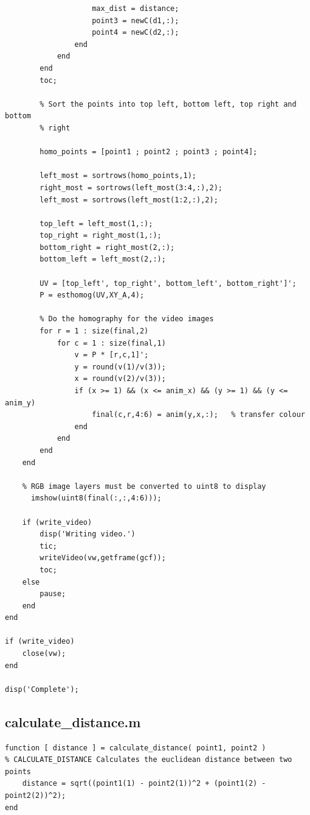 \documentclass[11pt]{article}
\begin{document}
\begin{verbatim}
                    max_dist = distance;
                    point3 = newC(d1,:);
                    point4 = newC(d2,:);
                end
            end
        end
        toc;
        
        % Sort the points into top left, bottom left, top right and bottom
        % right
        
        homo_points = [point1 ; point2 ; point3 ; point4];

        left_most = sortrows(homo_points,1);
        right_most = sortrows(left_most(3:4,:),2);
        left_most = sortrows(left_most(1:2,:),2);

        top_left = left_most(1,:);
        top_right = right_most(1,:);
        bottom_right = right_most(2,:);
        bottom_left = left_most(2,:);

        UV = [top_left', top_right', bottom_left', bottom_right']'; 
        P = esthomog(UV,XY_A,4);

        % Do the homography for the video images
        for r = 1 : size(final,2)
            for c = 1 : size(final,1)
                v = P * [r,c,1]';        
                y = round(v(1)/v(3));
                x = round(v(2)/v(3));
                if (x >= 1) && (x <= anim_x) && (y >= 1) && (y <= anim_y)
                    final(c,r,4:6) = anim(y,x,:);   % transfer colour
                end
            end
        end
    end
  
    % RGB image layers must be converted to uint8 to display
      imshow(uint8(final(:,:,4:6)));
    
    if (write_video)
        disp('Writing video.')
        tic;
        writeVideo(vw,getframe(gcf));
        toc;
    else
        pause;
    end
end

if (write_video)
    close(vw);
end

disp('Complete');
\end{verbatim}

\subsection{calculate\_distance.m}
\begin{verbatim}
function [ distance ] = calculate_distance( point1, point2 )
% CALCULATE_DISTANCE Calculates the euclidean distance between two points
    distance = sqrt((point1(1) - point2(1))^2 + (point1(2) - point2(2))^2);
end
\end{verbatim}
\end{document}
